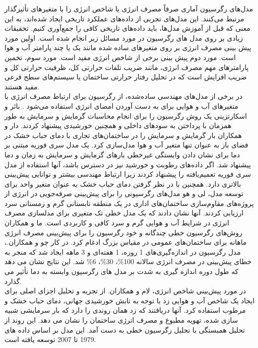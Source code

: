 مدل‌های رگرسیون آماری صرفاً مصرف انرژی یا شاخص انرژی را با متغیرهای تأثیرگذار مرتبط می‌کنند. این مدل‌های تجربی از داده‌های عملکرد تاریخی ایجاد شده‌اند، به این معنی که قبل از آموزش مدل‌ها، باید داده‌های تاریخی کافی را جمع‌آوری کنیم. تحقیقات زیادی بر روی مدل های رگرسیون در مورد مسائل زیر انجام شده است. اولین مورد پیش بینی مصرف انرژی بر روی متغیرهای ساده شده مانند یک یا چند پارامتر آب و هوا است. مورد دوم پیش بینی برخی از شاخص انرژی مفید است. مورد سوم، تخمین پارامترهای مهم مصرف انرژی، مانند ضریب تلفات حرارتی کل، ظرفیت حرارتی کل و ضریب افزایش است که در تحلیل رفتار حرارتی ساختمان یا سیستم‌های سطح فرعی مفید هستند.
\\
در برخی از مدل‌های مهندسی ساده‌شده، از رگرسیون برای ارتباط مصرف انرژی با متغیرهای آب و هوایی برای به دست آوردن امضای انرژی استفاده می‌شود \cite{pfafferott2005thermal,bauer1998simplified}. بائر و اسکارتزینی \cite{bauer1998simplified} یک روش رگرسیون را برای انجام محاسبات گرمایش و سرمایش به طور همزمان با پرداختن به سودهای داخلی و همچنین خورشیدی پیشنهاد کردند. دار و همکاران \cite{dhar1998modeling,dhar1999fourier} بار گرمایش و سرمایش را در ساختمان‌های تجاری با دمای حباب خشک در فضای باز به عنوان تنها متغیر آب و هوا مدل‌سازی کرد. یک مدل سری فوریه مبتنی بر دما برای نشان دادن وابستگی غیرخطی بارهای گرمایش و سرمایش به زمان و دما پیشنهاد شد. اگر داده‌های رطوبت و خورشید نیز در دسترس باشد، آنها استفاده از مدل سری فوریه تعمیم‌یافته را پیشنهاد کردند زیرا ارتباط مهندسی بیشتر و توانایی پیش‌بینی بالاتری دارد. همچنین با در نظر گرفتن دمای حباب خشک به عنوان متغیر واحد برای توسعه مدل، لی و هو \cite{lei2009baseline} مدل‌های رگرسیونی را برای پیش‌بینی صرفه‌جویی در انرژی از پروژه‌های مقاوم‌سازی ساختمان‌های اداری در یک منطقه تابستانی گرم و زمستانی سرد ارزیابی کردند. آنها نشان دادند که یک مدل خطی تک متغیری برای مدلسازی مصرف انرژی در شرایط آب و هوایی گرم و سرد کافی و کاربردی است. ما و همکاران\cite{ma2010study} روش‌های رگرسیون خطی چندگانه و خود رگرسیون را برای پیش‌بینی مصرف انرژی ماهانه برای ساختمان‌های عمومی در مقیاس بزرگ ادغام کرد. در کار چو و همکاران.\cite{cho2004effect}، مدل رگرسیون در اندازه‌گیری‌های 1 روزه، 1 هفته‌ای و 3 ماهه ایجاد شد که منجر به خطای پیش‌بینی در مصرف انرژی سالانه 100\%، 30\%، 6\% شد. این نتایج نشان می دهد که طول دوره اندازه گیری به شدت بر مدل های رگرسیون وابسته به دما تأثیر می گذارد.
\\
در مورد پیش‌بینی شاخص انرژی، لام و همکاران.\cite{lam2010principal} از تجزیه و تحلیل اجزای اصلی  برای ایجاد یک شاخص آب و هوایی زد با توجه به تابش خورشیدی جهانی، دمای حباب خشک و مرطوب استفاده کرد. آنها دریافتند که زد همان روندی را دارد که بار سرمایشی شبیه سازی شده، تهویه مطبوع و مصرف انرژی ساختمان را نشان می دهد. این روند از تحلیل همبستگی با تحلیل رگرسیون خطی به دست آمد. این مدل بر اساس داده های 1979 تا 2007 توسعه یافته است.

